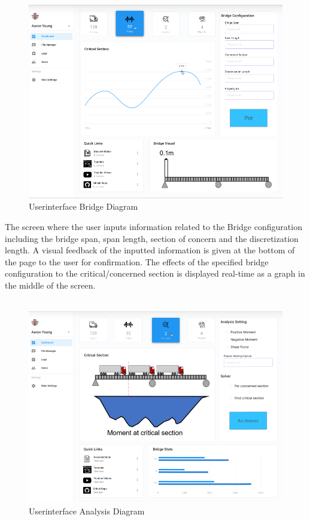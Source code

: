 \documentclass[12pt, titlepage]{article}
\begin{document}
\begin{figure}[H]
  \includegraphics[]{../images/Userinterface-Bridge.PNG}
  \caption{Userinterface Bridge Diagram}
  \label{fig:userinterface-bridge-diagram}
\end{figure}
The screen where the user inputs information related to the Bridge configuration including the bridge span, span length, section of concern and the discretization length. A visual feedback of the inputted information is given at the bottom of the page to the user for confirmation. The effects of the specified bridge configuration to the critical/concerned section is displayed real-time as a graph in the middle of the screen.\\\\
\begin{figure}[H]
  \includegraphics[]{../images/Userinterface-Analysis.PNG}
  \caption{Userinterface Analysis Diagram}
  \label{fig:userinterface-analysis-diagram}
\end{figure}
\end{document}
